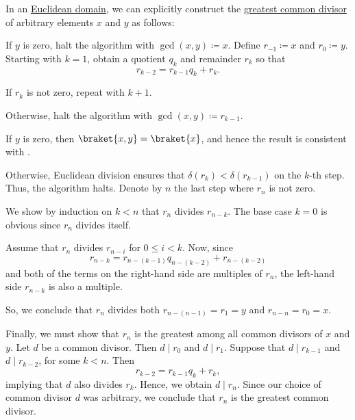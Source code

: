 \begin{algorithm}\label{alg:euclidean_algorithm}
  In an \hyperref[def:euclidean_domain]{Euclidean domain}, we can explicitly construct the \hyperref[def:gcd_and_lcm]{greatest common divisor} of arbitrary elements \( x \) and \( y \) as follows:
  \begin{thmenum}
     If \( y \) is zero, halt the algorithm with \( \gcd(x, y) \coloneqq x \).
     Define \( r_{-1} \coloneqq x \) and \( r_0 \coloneqq y \).
     Starting with \( k = 1 \), obtain a quotient \( q_k \) and remainder \( r_k \) so that
    \begin{equation*}
      r_{k-2} = r_{k-1} q_k + r_k.
    \end{equation*}

    If \( r_k \) is not zero, repeat  with \( k + 1 \).

    Otherwise, halt the algorithm with \( \gcd(x, y) \coloneqq r_{k-1} \).
  \end{thmenum}
\end{algorithm}
\begin{defproof}
  If \( y \) is zero, then \( \braket{ x, y } = \braket{ x } \), and hence the result is consistent with .

  Otherwise, Euclidean division ensures that \( \delta(r_k) < \delta(r_{k-1}) \) on the \( k \)-th step. Thus, the algorithm halts. Denote by \( n \) the last step where \( r_n \) is not zero.

  We show by induction on \( k < n \) that \( r_n \) divides \( r_{n-k} \). The base case \( k = 0 \) is obvious since \( r_n \) divides itself.

  Assume that \( r_n \) divides \( r_{n-i} \) for \( 0 \leq i < k \). Now, since
  \begin{equation*}
    r_{n-k} = r_{n-(k-1)} q_{n-(k-2)} + r_{n-(k-2)}
  \end{equation*}
  and both of the terms on the right-hand side are multiples of \( r_n \), the left-hand side \( r_{n-k} \) is also a multiple.

  So, we conclude that \( r_n \) divides both \( r_{n-(n-1)} = r_1 = y \) and \( r_{n-n} = r_0 = x \).

  Finally, we must show that \( r_n \) is the greatest among all common divisors of \( x \) and \( y \). Let \( d \) be a common divisor. Then \( d \mid r_0 \) and \( d \mid r_1 \). Suppose that \( d \mid r_{k-1} \) and \( d \mid r_{k-2} \), for some \( k < n \). Then
  \begin{equation*}
    r_{k-2} = r_{k-1} q_k + r_k,
  \end{equation*}
  implying that \( d \) also divides \( r_k \). Hence, we obtain \( d \mid r_n \). Since our choice of common divisor \( d \) was arbitrary, we conclude that \( r_n \) is the greatest common divisor.
\end{defproof}

